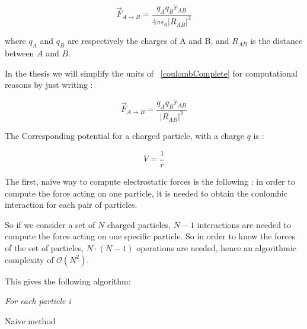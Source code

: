 \documentclass[10pt,twoside,a4paper]{report}
\begin{document}
\begin{equation}
	\overrightarrow{F}_{A \rightarrow B} = \frac{q_A q_B \hat{r}_{AB} }{4\pi\epsilon_0|R_{AB}|^2}
	\label{coulombComplete}
\end{equation}

where $q_A $ and $q_B$ are respectively the charges of A and B, and $R_{AB}$ is the distance between $A$ and $B$.

In the thesis we will simplify the units of ~\eqref{coulombComplete} for computational reasons by just writing :

\begin{equation}
	\overrightarrow{F}_{A \rightarrow B} = \frac{q_A q_B \hat{r}_{AB} }{|R_{AB}|^2}
	\label{coulombSimplified}
\end{equation}

The Corresponding potential for a charged particle, with a charge $q$ is :

\begin{equation}
	V = \frac{1}{r}
	\label{potential}
\end{equation}



The first, naive way to compute electrostatic forces is the following : in order to compute the force acting on one particle, it is needed to obtain the coulombic interaction for each pair of particles.

So if we consider a set of $N$ charged particles, $N-1$ interactions are needed to compute the force acting on one specific particle. So in order to know the forces of the set of particles, $N\cdot(N-1)$ operations are needed, hence an algorithmic complexity of $\mathcal{O}(N^2)$.

This gives the following algorithm:



\IncMargin{1em}
\begin{algorithm}[H]



\BlankLine

\emph{For each particle i}\;
\caption{Naive method}\label{algo_disjdecomp}
\end{algorithm}\DecMargin{1em}
\end{document}

